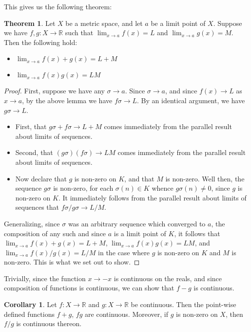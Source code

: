 \documentclass[11pt]{article}
\newcommand{\R}{\mathbb{R}}
\theoremstyle{definition}
\newtheorem{theorem}{Theorem}
\newtheorem{corollary}{Corollary}
\begin{document}
This gives us the following theorem:

\begin{theorem}
Let $X$ be a metric space, and let $a$ be a limit point of $X$. Suppose we have $f,g:X\to \R$ such that $\lim_{x\to a} f(x) = L$ and $ \lim_{x\to a}g(x) = M $. Then the following hold:

\begin{itemize}
\item $\lim_{x\to a} f(x) + g(x) = L + M$
\item $ \lim_{x \to a}f(x)g(x) = LM $
\end{itemize}
\end{theorem}

\begin{proof}

First, suppose we have any $\sigma\to a$. Since $\sigma\to a$, and since $f(x)\to L$ as $x\to a$, by the above lemma we have $f\sigma\to L$. By an identical argument, we have $ g\sigma \to L $. 
\begin{itemize}
\item First, that $g\sigma + f\sigma \to L + M$ comes immediately from the parallel result about limits of sequences. 
\item Second, that $(g\sigma)(f\sigma) \to LM$ comes immediately from the parallel result about limits of sequences.
\item Now declare that $g$ is non-zero on $K$, and that $M$ is non-zero. Well then, the sequence $g\sigma$ is non-zero, for each $\sigma(n)\in K$ whence $g\sigma(n)\ne 0$, since $g$ is non-zero on $K$. It immediately follows from the parallel result about limits of sequences that $ f\sigma/g\sigma \to L/M $.
\end{itemize}
Generalizing, since $\sigma$ was an arbitrary sequence which converged to $a$, the composition of any such  and since $a$ is a limit point of $K$, it follows that $ \lim_{x\to a} f(x) + g(x) = L + M $, $\lim_{x\to a}f(x) g(x) = LM$, and $\lim_{x\to a} f(x) /g(x) = L/M $ in the case where $g$ is non-zero on $K$ and $M$ is non-zero. This is what we set out to show.


\end{proof}

Trivially, since the function $x\to -x$ is continuous on the reals, and since composition of functions is continuous, we can show that $f-g$ is continuous.

\begin{corollary}
Let $f:X\to \R$ and $g:X\to \R$ be continuous. Then the point-wise defined functions $f + g$, $fg$ are continuous. Moreover, if $g$ is non-zero on $X$, then $f/g$ is continuous thereon. 
\end{corollary}
\end{document}
